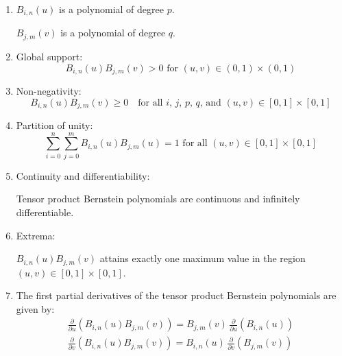\begin{enumerate}

    \item $B_{i,n}(u)$ is a polynomial of degree $p$.
    
    $B_{j,m}(v)$ is a polynomial of degree $q$.
    
    \item Global support:
    \begin{equation*}
        B_{i,n}(u)B_{j,m}(v)>0 \text{ for } (u,v) \in (0,1)\times(0,1)
    \end{equation*}
    
    \item Non-negativity:
        \begin{equation*}
            B_{i,n}(u)B_{j,m}(v) \geq 0 \quad \text{for all $i$, $j$, $p$, $q$, and $(u,v) \in [0, 1] \times [0, 1]$}
        \end{equation*}

    \item Partition of unity:
        \begin{equation*}
            \sum_{i=0}^n  \sum_{j=0}^{m} B_{i,n}(u) B_{j,m}(u) = 1 \text{ for all } (u,v) \in [0, 1] \times [0, 1]
        \end{equation*}
        
    \item Continuity and differentiability:
    
    Tensor product Bernstein polynomials are continuous and infinitely differentiable.

    \item Extrema:
    
    $B_{i,n}(u)B_{j,m}(v)$ attains exactly one maximum value in the region $(u,v) \in [0, 1] \times [0, 1]$.
    
    \item The first partial derivatives of the tensor product Bernstein polynomials are given by:
    \begin{align*}
    \frac{\partial}{\partial u} \left( B_{i,n}(u)B_{j,m}(v) \right) = B_{j,m}(v) \, \frac{\partial}{\partial u} \left(B_{i,n}(u)\right) \\
        \frac{\partial}{\partial v} \left(B_{i,n}(u)B_{j,m}(v) \right) = B_{i,n}(u) \, \frac{\partial}{\partial v} \left(B_{j,m}(v)\right)
    \end{align*}
    
\end{enumerate}



